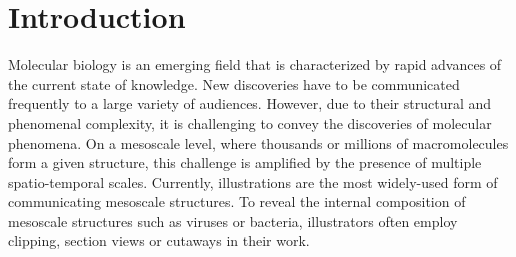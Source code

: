 \section{Introduction}\label{sec:intro}

Molecular biology is an emerging field that is characterized by rapid advances of the current state of knowledge.
New discoveries have to be communicated frequently to a large variety of audiences.
However, due to their structural and phenomenal complexity, it is challenging to convey the discoveries of molecular phenomena. On a mesoscale level, where thousands or millions of macromolecules form a given structure, this challenge is amplified by the presence of multiple spatio-temporal scales. Currently, illustrations are the most widely-used form of communicating mesoscale structures. To reveal the internal composition of mesoscale structures such as viruses or bacteria, illustrators often employ clipping, section views or cutaways in their work.



